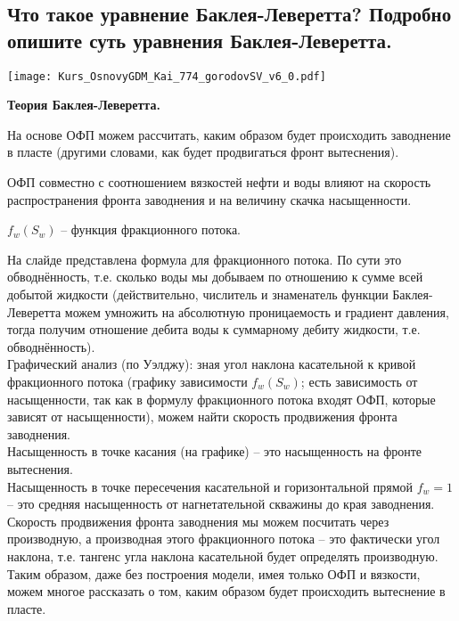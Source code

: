 

\subsection{Что такое уравнение Баклея-Леверетта? Подробно опишите суть уравнения Баклея-Леверетта.}

\texttt{[image: Kurs\_OsnovyGDM\_Kai\_774\_gorodovSV\_v6\_0.pdf]}

\textbf{Теория Баклея-Леверетта.}

На основе ОФП можем рассчитать, каким образом будет происходить заводнение в пласте  (другими словами, как будет продвигаться фронт вытеснения).

ОФП совместно с соотношением вязкостей нефти и воды влияют на скорость распространения фронта заводнения и на величину скачка насыщенности.

$f_w(S_w)$ -- функция фракционного потока.

На слайде представлена формула для фракционного потока.
По сути это обводнённость, т.е. сколько воды мы добываем по отношению к сумме всей добытой жидкости (действительно, числитель и знаменатель функции Баклея-Леверетта можем умножить на абсолютную проницаемость и градиент давления, тогда получим отношение дебита воды к суммарному дебиту жидкости, т.е. обводнённость).
\\

Графический анализ (по Уэлджу): зная угол наклона касательной к кривой фракционного потока (графику зависимости $f_w(S_w)$; есть зависимость от насыщенности, так как в формулу фракционного потока входят ОФП, которые зависят от насыщенности), можем найти скорость продвижения фронта заводнения.
\\

Насыщенность в точке касания (на графике) -- это насыщенность на фронте вытеснения.
\\

Насыщенность в точке пересечения касательной и горизонтальной прямой $f_w=1$ -- это средняя насыщенность от нагнетательной скважины до края заводнения.
\\

Скорость продвижения фронта заводнения мы можем посчитать через производную, а производная этого фракционного потока -- это фактически угол наклона, т.е. тангенс угла наклона касательной будет определять производную.
\\

Таким образом, даже без построения модели, имея только ОФП и вязкости, можем многое рассказать о том, каким образом будет происходить вытеснение в пласте.


